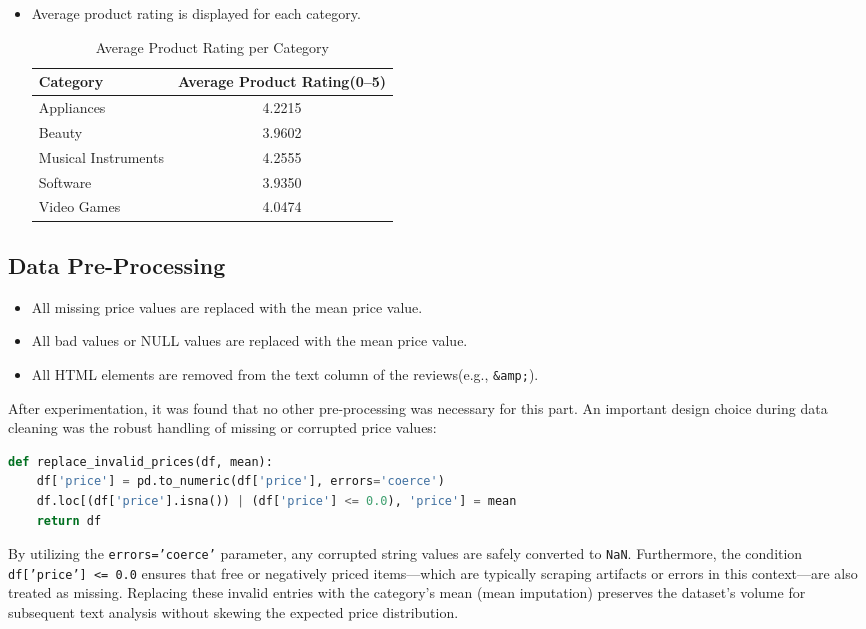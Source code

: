 \documentclass[a4paper, 12pt]{article}
\begin{document}
\begin{itemize}
    \item Average product rating is displayed for each category.
    \begin{table}[H]
        \centering
        \caption{Average Product Rating per Category}
        \begin{tabular}{lc}
        \hline
        \textbf{Category} & \textbf{Average Product Rating(0--5)} \\
        \hline
        Appliances & 4.2215 \\
        Beauty & 3.9602 \\
        Musical Instruments & 4.2555 \\
        Software & 3.9350 \\
        Video Games & 4.0474 \\
        \hline
        \end{tabular}
        \label{tab:avg_rating}
    \end{table}
\end{itemize}

\subsection{Data Pre-Processing}
\begin{itemize}
    \item All missing price values are replaced with the mean price value.
    \item All bad values or NULL values are replaced with the mean price value.
    \item All HTML elements are removed from the text column of the reviews(e.g., \texttt{\&amp;}).
\end{itemize}
After experimentation, it was found that no other pre-processing was necessary for this part.
An important design choice during data cleaning was the robust handling of missing or corrupted price values:

\begin{lstlisting}[language=Python]
def replace_invalid_prices(df, mean):
    df['price'] = pd.to_numeric(df['price'], errors='coerce') 
    df.loc[(df['price'].isna()) | (df['price'] <= 0.0), 'price'] = mean
    return df
\end{lstlisting}

By utilizing the \texttt{errors='coerce'} parameter, any corrupted string values are safely converted to \texttt{NaN}. Furthermore, the condition \texttt{df['price'] <= 0.0} ensures that free or negatively priced items---which are typically scraping artifacts or errors in this context---are also treated as missing. Replacing these invalid entries with the category's mean (mean imputation) preserves the dataset's volume for subsequent text analysis without skewing the expected price distribution.
\end{document}
